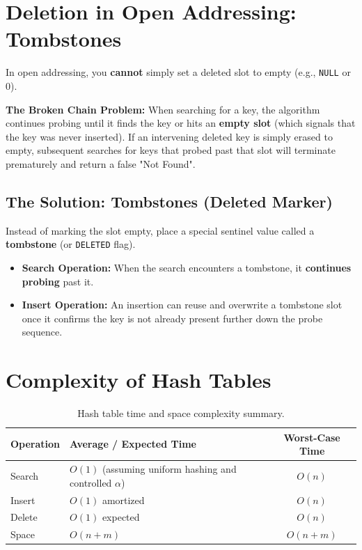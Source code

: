 \section{Deletion in Open Addressing: Tombstones}

In open addressing, you \textbf{cannot} simply set a deleted slot to empty (e.g., \texttt{NULL} or $0$).

\textbf{The Broken Chain Problem:} When searching for a key, the algorithm continues probing until it finds the key or hits an \textbf{empty slot} (which signals that the key was never inserted). If an intervening deleted key is simply erased to empty, subsequent searches for keys that probed past that slot will terminate prematurely and return a false "Not Found".

\subsection{The Solution: Tombstones (Deleted Marker)}
Instead of marking the slot empty, place a special sentinel value called a \textbf{tombstone} (or \texttt{DELETED} flag).
\begin{itemize}
    \item \textbf{Search Operation:} When the search encounters a tombstone, it \textbf{continues probing} past it.
    \item \textbf{Insert Operation:} An insertion can reuse and overwrite a tombstone slot once it confirms the key is not already present further down the probe sequence.
\end{itemize}

\section{Complexity of Hash Tables}

\begin{table}[htbp]
\centering
\small
\begin{tabularx}{\textwidth}{l X c}
\toprule
\textbf{Operation} & \textbf{Average / Expected Time} & \textbf{Worst-Case Time} \\
\midrule
Search & $O(1)$ (assuming uniform hashing and controlled $\alpha$) & $O(n)$ \\
Insert & $O(1)$ amortized & $O(n)$ \\
Delete & $O(1)$ expected & $O(n)$ \\
Space  & $O(n + m)$ & $O(n + m)$ \\
\bottomrule
\end{tabularx}
\caption{Hash table time and space complexity summary.}
\end{table}

